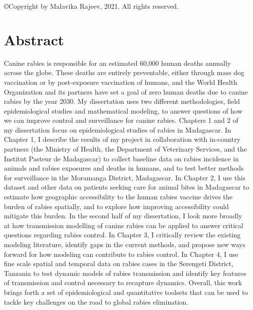 
\begin{center}

\copyright  Copyright by Malavika Rajeev, 2021. All rights reserved.

\end{center}

\frontmatter

\setcounter{page}{3}  %

\section*{Abstract}

Canine rabies is responsible for an estimated 60,000 human deaths annually across the globe. These deaths are entirely preventable, either through mass dog vaccination or by post-exposure vaccination of humans, and the World Health Organization and its partners have set a goal of zero human deaths due to canine rabies by the year 2030. My dissertation uses two different methodologies, field epidemiological studies and mathematical modeling, to answer questions of how we can improve control and surveillance for canine rabies. Chapters 1 and 2 of my dissertation focus on epidemiological studies of rabies in Madagascar. In Chapter 1, I describe the results of my project in collaboration with in-country partners (the Ministry of Health, the Department of Veterinary Services, and the Institut Pasteur de Madagascar) to collect baseline data on rabies incidence in animals and rabies exposures and deaths in humans, and to test better methods for surveillance in the Moramanga District, Madagascar. In Chapter 2, I use this dataset and other data on patients seeking care for animal bites in Madagascar to estimate how geographic accessibility to the human rabies vaccine drives the burden of rabies spatially, and to explore how improving accessibility could mitigate this burden. In the second half of my dissertation, I look more broadly at how transmission modelling of canine rabies can be applied to answer critical questions regarding rabies control. In Chapter 3, I critically review the existing modeling literature, identify gaps in the current methods, and propose new ways forward for how modeling can contribute to rabies control. In Chapter 4, I use fine scale spatial and temporal data on rabies cases in the Serengeti District, Tanzania to test dynamic models of rabies transmission and identify key features of transmission and control necessary to recapture dynamics. Overall, this work brings forth a set of epidemiological and quantitative toolsets that can be used to tackle key challenges on the road to global rabies elimination. 
